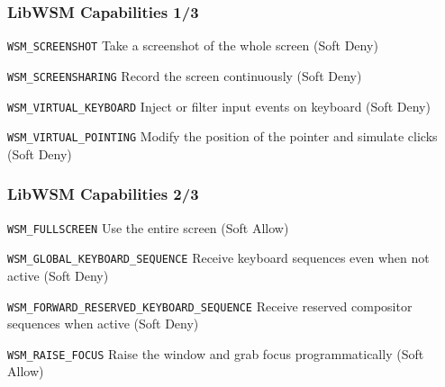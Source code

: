 \begin{frame}
\frametitle{LibWSM Capabilities 1/3}

	\begin{block}{\texttt{WSM\_SCREENSHOT}}
	Take a screenshot of the whole screen {\small({\color{xorg-palette-light}Soft Deny})}
	\end{block}

	\begin{block}{\texttt{WSM\_SCREENSHARING}}
	Record the screen continuously ({\color{xorg-palette-light}Soft Deny})
	\end{block}

	\begin{block}{\texttt{WSM\_VIRTUAL\_KEYBOARD}}
	Inject or filter input events on keyboard ({\color{xorg-palette-light}Soft Deny})
	\end{block}

	\begin{block}{\texttt{WSM\_VIRTUAL\_POINTING}}
    Modify the position of the pointer and simulate clicks ({\color{xorg-palette-light}Soft Deny})
	\end{block}
\end{frame}

\begin{frame}
\frametitle{LibWSM Capabilities 2/3}
	\begin{block}{\texttt{WSM\_FULLSCREEN}}
	Use the entire screen ({\color{xorg-palette-light}Soft Allow})
	\end{block}

	\begin{block}{\texttt{WSM\_GLOBAL\_KEYBOARD\_SEQUENCE} {\color{xorg-slide-fg}{\scriptsize[obj: key sequence]}}}
	Receive keyboard sequences even when not active ({\color{xorg-palette-light}Soft Deny})
	\end{block}

	\begin{block}{\texttt{WSM\_FORWARD\_RESERVED\_KEYBOARD\_SEQUENCE} {\color{xorg-slide-fg}{\scriptsize[obj: key sequence]}}}
	Receive reserved compositor sequences when active ({\color{xorg-palette-light}Soft Deny})
	\end{block}

	\begin{block}{\texttt{WSM\_RAISE\_FOCUS}}
	Raise the window and grab focus programmatically
	({\color{xorg-palette-light}Soft Allow})
	\end{block}
\end{frame}

